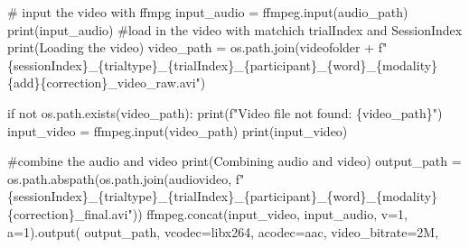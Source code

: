 \documentclass[
  letterpaper,
  DIV=11,
  numbers=noendperiod]{scrreprt}
\newenvironment{Shaded}{\begin{snugshade}}{\end{snugshade}}
\newcommand{\BuiltInTok}[1]{\textcolor[rgb]{0.00,0.23,0.31}{#1}}
\newcommand{\CommentTok}[1]{\textcolor[rgb]{0.37,0.37,0.37}{#1}}
\newcommand{\ControlFlowTok}[1]{\textcolor[rgb]{0.00,0.23,0.31}{#1}}
\newcommand{\DecValTok}[1]{\textcolor[rgb]{0.68,0.00,0.00}{#1}}
\newcommand{\KeywordTok}[1]{\textcolor[rgb]{0.00,0.23,0.31}{#1}}
\newcommand{\NormalTok}[1]{\textcolor[rgb]{0.00,0.23,0.31}{#1}}
\newcommand{\OperatorTok}[1]{\textcolor[rgb]{0.37,0.37,0.37}{#1}}
\newcommand{\SpecialCharTok}[1]{\textcolor[rgb]{0.37,0.37,0.37}{#1}}
\newcommand{\SpecialStringTok}[1]{\textcolor[rgb]{0.13,0.47,0.30}{#1}}
\newcommand{\StringTok}[1]{\textcolor[rgb]{0.13,0.47,0.30}{#1}}
\begin{document}
\begin{Shaded}
\begin{Highlighting}[]
    \CommentTok{\# input the video with ffmpg}
\NormalTok{    input\_audio }\OperatorTok{=}\NormalTok{ ffmpeg.}\BuiltInTok{input}\NormalTok{(audio\_path)}
    \BuiltInTok{print}\NormalTok{(input\_audio)}
    \CommentTok{\#load in the video with matchich trialIndex and SessionIndex}
    \BuiltInTok{print}\NormalTok{(}\StringTok{\textquotesingle{}Loading the video\textquotesingle{}}\NormalTok{)}
\NormalTok{    video\_path }\OperatorTok{=}\NormalTok{ os.path.join(videofolder }\OperatorTok{+} \SpecialStringTok{f"}\SpecialCharTok{\{}\NormalTok{sessionIndex}\SpecialCharTok{\}}\SpecialStringTok{\_}\SpecialCharTok{\{}\NormalTok{trialtype}\SpecialCharTok{\}}\SpecialStringTok{\_}\SpecialCharTok{\{}\NormalTok{trialIndex}\SpecialCharTok{\}}\SpecialStringTok{\_}\SpecialCharTok{\{}\NormalTok{participant}\SpecialCharTok{\}}\SpecialStringTok{\_}\SpecialCharTok{\{}\NormalTok{word}\SpecialCharTok{\}}\SpecialStringTok{\_}\SpecialCharTok{\{}\NormalTok{modality}\SpecialCharTok{\}\{}\NormalTok{add}\SpecialCharTok{\}\{}\NormalTok{correction}\SpecialCharTok{\}}\SpecialStringTok{\_video\_raw.avi"}\NormalTok{)}

    \ControlFlowTok{if} \KeywordTok{not}\NormalTok{ os.path.exists(video\_path):}
        \BuiltInTok{print}\NormalTok{(}\SpecialStringTok{f"Video file not found: }\SpecialCharTok{\{}\NormalTok{video\_path}\SpecialCharTok{\}}\SpecialStringTok{"}\NormalTok{)}
\NormalTok{    input\_video }\OperatorTok{=}\NormalTok{ ffmpeg.}\BuiltInTok{input}\NormalTok{(video\_path)}
    \BuiltInTok{print}\NormalTok{(input\_video)}
    
    \CommentTok{\#combine the audio and video}
    \BuiltInTok{print}\NormalTok{(}\StringTok{\textquotesingle{}Combining audio and video\textquotesingle{}}\NormalTok{)}
\NormalTok{    output\_path }\OperatorTok{=}\NormalTok{ os.path.abspath(os.path.join(audiovideo, }\SpecialStringTok{f"}\SpecialCharTok{\{}\NormalTok{sessionIndex}\SpecialCharTok{\}}\SpecialStringTok{\_}\SpecialCharTok{\{}\NormalTok{trialtype}\SpecialCharTok{\}}\SpecialStringTok{\_}\SpecialCharTok{\{}\NormalTok{trialIndex}\SpecialCharTok{\}}\SpecialStringTok{\_}\SpecialCharTok{\{}\NormalTok{participant}\SpecialCharTok{\}}\SpecialStringTok{\_}\SpecialCharTok{\{}\NormalTok{word}\SpecialCharTok{\}}\SpecialStringTok{\_}\SpecialCharTok{\{}\NormalTok{modality}\SpecialCharTok{\}\{}\NormalTok{correction}\SpecialCharTok{\}}\SpecialStringTok{\_final.avi"}\NormalTok{))}
\NormalTok{    ffmpeg.concat(input\_video, input\_audio, v}\OperatorTok{=}\DecValTok{1}\NormalTok{, a}\OperatorTok{=}\DecValTok{1}\NormalTok{).output(}
\NormalTok{        output\_path,}
\NormalTok{        vcodec}\OperatorTok{=}\StringTok{\textquotesingle{}libx264\textquotesingle{}}\NormalTok{,}
\NormalTok{        acodec}\OperatorTok{=}\StringTok{\textquotesingle{}aac\textquotesingle{}}\NormalTok{,}
\NormalTok{        video\_bitrate}\OperatorTok{=}\StringTok{\textquotesingle{}2M\textquotesingle{}}\NormalTok{,         }
        

\end{Highlighting}
\end{Shaded}
\end{document}
